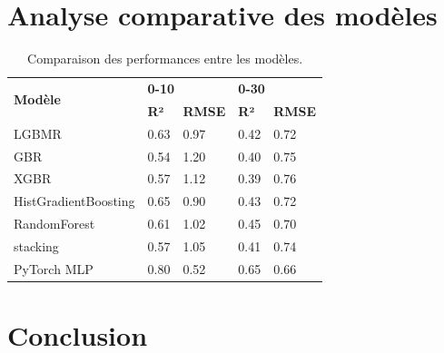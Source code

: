 \documentclass[12pt,a4paper,oneside]{report}
\begin{document}
\section{Analyse comparative des modèles}

\begin{table}[h]
\centering
\begin{tabular}{l l l l l}
\toprule
\multirow{2}{*}{\textbf{Modèle}} & \multicolumn{2}{l}{\textbf{0-10}} & \multicolumn{2}{l}{\textbf{0-30}} \\
\cmidrule(lr){2-3} \cmidrule(lr){4-5}
& \textbf{R²} & \textbf{RMSE} & \textbf{R²} & \textbf{RMSE} \\
\midrule
LGBMR & 0.63 & 0.97 &0.42 &0.72 \\
GBR & 0.54 & 1.20 & 0.40 &0.75 \\
XGBR & 0.57 & 1.12 & 0.39 &0.76 \\
HistGradientBoosting & 0.65 & 0.90 & 0.43 &0.72 \\
RandomForest & 0.61 & 1.02 & 0.45 &0.70 \\
stacking & 0.57 & 1.05 & 0.41 &0.74 \\
PyTorch MLP  & 0.80 & 0.52 & 0.65 &0.66 \\
\bottomrule
\end{tabular}
\caption{Comparaison des performances entre les modèles.}
\end{table}




\section{Conclusion}
\end{document}
